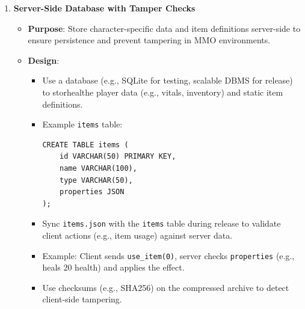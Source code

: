 \begin{enumerate}
    \item \textbf{Server-Side Database with Tamper Checks}
        \begin{itemize}
            \item \textbf{Purpose}: Store character-specific data and item definitions server-side to ensure persistence and prevent tampering in MMO environments.
            \item \textbf{Design}:
                \begin{itemize}
                    \item Use a database (e.g., SQLite for testing, scalable DBMS for release) to storhealthe player data (e.g., vitals, inventory) and static item definitions.
                    \item Example \texttt{items} table:
                    \begin{lstlisting}[style=htmlstyle]
CREATE TABLE items (
    id VARCHAR(50) PRIMARY KEY,
    name VARCHAR(100),
    type VARCHAR(50),
    properties JSON
);
                    \end{lstlisting}
                    \item Sync \texttt{items.json} with the \texttt{items} table during release to validate client actions (e.g., item usage) against server data.
                    \item Example: Client sends \texttt{use\_item(0)}, server checks \texttt{properties} (e.g., heals 20 health) and applies the effect.
                    \item Use checksums (e.g., SHA256) on the compressed archive to detect client-side tampering.
                \end{itemize}
        \end{itemize}


\end{enumerate}
